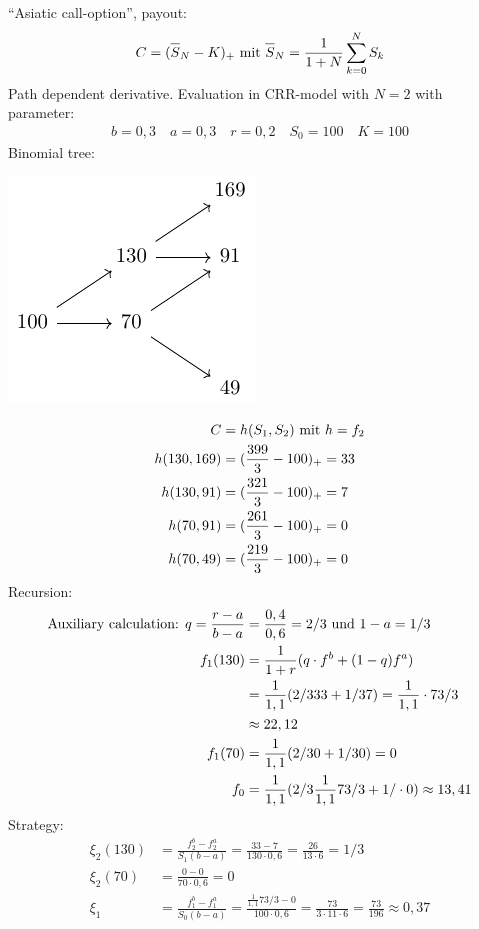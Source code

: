 \begin{*example}
	``Asiatic call-option'', payout:
	\begin{align*}
		C=(\overline{S}_N - K)_+ \mit \overline{S}_N = \frac{1}{1+N}\sum_{k=0}^N S_k
	\end{align*}
	Path dependent derivative. Evaluation in CRR-model with $N=2$ with parameter:
	\begin{align*}
		b=0,3\quad a=0,3 \quad r = 0,2\quad S_0 = 100\quad K = 100
	\end{align*}
	Binomial tree:
	\begin{center}
		\includegraphics[width=.5\textwidth]{tikz/stochv_2_3.pdf}
	\end{center}
	\begin{align*}
		C&=h(S_1,S_2) \mit h = f_2\\
		h(130,169) &= (\frac{399}{3}-100)_+ = 33\\
		h(130,91) &= (\frac{321}{3}-100)_+ = 7\\
		h(70,91) &= (\frac{261}{3}-100)_+ = 0\\
		h(70,49) &= (\frac{219}{3}-100)_+ = 0
	\end{align*}
	Recursion:\\
	\begin{align*}
		\text{Auxiliary calculation: }q = \frac{r-a}{b-a} &= \frac{0,4}{0,6} = 2/3 \und 1-a = 1/3\\
		f_1(130) &= \frac{1}{1+r}(q \cdot f^b + (1-q)f^a)\\
		&= \frac{1}{1,1}(2/3 33 + 1/3 7) = \frac{1}{1,1}\cdot 73/3\\
		&\approx 22,12\\
		f_1(70) &= \frac{1}{1,1}(2/3 0 + 1/3 0) = 0\\
		f_0 &= \frac{1}{1,1}(2/3 \frac{1}{1,1} 73/3 + 1/\cdot 0) \approx 13,41
	\end{align*}
	Strategy:
	\begin{align*}
		\xi_2(130) &= \frac{f_2^b - f_2^a}{S_1 (b-a)} = \frac{33-7}{130\cdot 0,6} = \frac{26}{13\cdot 6} = 1/3\\
		\xi_2(70) &= \frac{0-0}{70\cdot 0,6} = 0\\
		\xi_1 &= \frac{f_1^b - f_1^a}{S_0(b-a)} = \frac{\frac{1}{1,1}73/3 - 0}{100\cdot 0,6} = \frac{73}{3\cdot 11 \cdot 6} = \frac{73}{196} \approx 0,37 
	\end{align*}
\end{*example}
